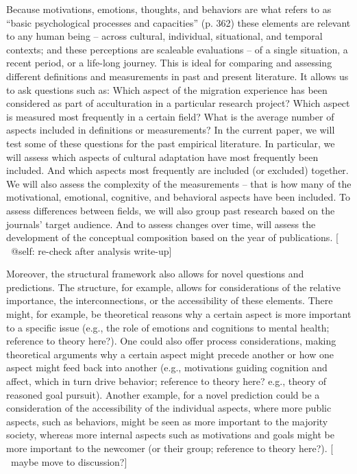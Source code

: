 \documentclass[man, 12pt, a4paper]{apa7}
\newcommand\Warning[1][2ex]{%
  \renewcommand\stacktype{L}%
  \scaleto{\stackon[1.3pt]{\color{red}$\triangle$}{\tiny\bfseries !}}{#1}}%
\begin{document}
Because motivations, emotions, thoughts, and behaviors are what \citet{Berry2009a} refers to as ``basic psychological processes and capacities'' (p. 362) these elements are relevant to any human being -- across cultural, individual, situational, and temporal contexts; and these perceptions are scaleable evaluations -- of a single situation, a recent period, or a life-long journey. This is ideal for comparing and assessing different definitions and measurements in past and present literature. It allows us to ask questions such as: Which aspect of the migration experience has been considered as part of acculturation in a particular research project? Which aspect is measured most frequently in a certain field? What is the average number of aspects included in definitions or measurements? 
In the current paper, we will test some of these questions for the past empirical literature. In particular, we will assess which aspects of cultural adaptation have most frequently been included. And which aspects most frequently are included (or excluded) together. We will also assess the complexity of the measurements -- that is how many of the motivational, emotional, cognitive, and behavioral aspects have been included. To assess differences between fields, we will also group past research based on the journals' target audience. And to assess changes over time, will assess the development of the conceptual composition based on the year of publications. [\Warning\ @self: re-check after analysis write-up]


Moreover, the structural framework also allows for novel questions and predictions. The structure, for example, allows for considerations of the relative importance, the interconnections, or the accessibility of these elements. There might, for example, be theoretical reasons why a certain aspect is more important to a specific issue (e.g., the role of emotions and cognitions to mental health; reference to theory here?). One could also offer process considerations, making theoretical arguments why a certain aspect might precede another or how one aspect might feed back into another (e.g., motivations guiding cognition and affect, which in turn drive behavior; reference to theory here? e.g., theory of reasoned goal pursuit). Another example, for a novel prediction could be a consideration of the accessibility of the individual aspects, where more public aspects, such as behaviors, might be seen as more important to the majority society, whereas more internal aspects such as motivations and goals might be more important to the newcomer (or their group; reference to theory here?). [\Warning\ maybe move to discussion?]
\end{document}
